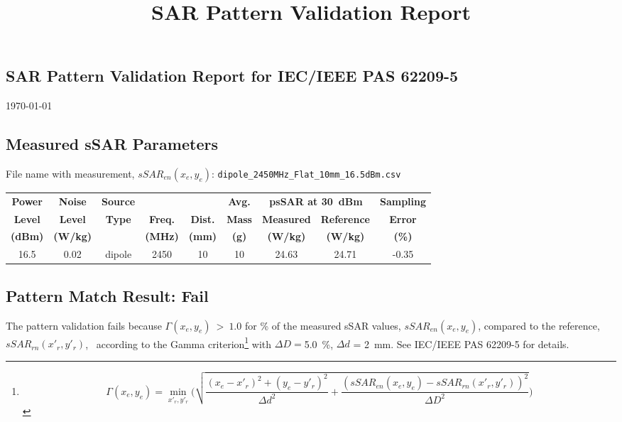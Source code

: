 \documentclass{article}
\title{SAR Pattern Validation Report}
\newcommand{\filemeas}{dipole\_2450MHz\_Flat\_10mm\_16.5dBm.csv}
\newcommand{\powerlevel}{16.5} %
\newcommand{\noiselevel}{0.02} %
\newcommand{\antennatype}{dipole}
\newcommand{\frequency}{2450} %
\newcommand{\distance}{10} %
\newcommand{\mass}{10}  %
\newcommand{\pssarref}{24.71}  %
\newcommand{\pssarmeas}{24.63} %
\newcommand{\errscale}{-0.35} %
\newcommand{\deltadist}{2~mm\xspace}
\newcommand{\deltadose}{5.0~\%\xspace}
\newcommand{\passfail}{\textbf{Fail}}
\newcommand{\statement}{The pattern validation fails because $\Gamma (x_e,y_e)~>~1.0$ for \failrate \% of the measured sSAR values, $sSAR_{en}(x_e,y_e)$, compared to the reference, $sSAR_{rn}(x'_r,y'_r)$, }
\newcommand{\passfail}{\textbf{Pass}}
\newcommand{\statement}{The pattern validation passes because $\Gamma (x_e,y_e)~>~1.0$ for all of the measured sSAR values, $sSAR_{en}(x_e,y_e)$, compared to the reference, $sSAR_{rn}(x'_r,y'_r)$, }
\begin{document}
\thispagestyle{empty}
\begin{center}
    \section*{SAR Pattern Validation Report for IEC/IEEE PAS 62209-5}
    \today
\end{center}

\subsection*{Measured sSAR Parameters}

File name with measurement, $sSAR_{en}(x_e,y_e)$: \texttt{\filemeas}

\begin{table}[htpb] \centering
\begin{tabular}{cccccc|ccc}
\textbf{Power} & \textbf{Noise} & \textbf{Source} &&& \textbf{Avg.}&\multicolumn{2}{c}{\textbf{psSAR at 30~dBm}}& \textbf{Sampling} \\
\textbf{Level} & \textbf{Level} &\textbf{Type} & \textbf{Freq.} & \textbf{Dist.} & \textbf{Mass} & \textbf{Measured} & \textbf{Reference} & \textbf{Error} \\
\textbf{(dBm)} & \textbf{(W/kg)} & & \textbf{(MHz)} & \textbf{(mm)} & \textbf{(g)} & \textbf{(W/kg)} & \textbf{(W/kg)} & \textbf{(\%)} \\\hline
\powerlevel & \noiselevel & \antennatype & \frequency & \distance & \mass & \pssarmeas & \pssarref & \errscale \\
\end{tabular}
\label{tab:meas-params}
\end{table}

\FloatBarrier
\subsection*{Pattern Match Result: \passfail}

\statement ~according to the Gamma criterion\footnote{
\[
\Gamma (x_e, y_e) = \min_{x'_r,y'_r}\Bigg(\sqrt{\frac{(x_e-x'_r)^2+(y_e-y'_r)^2}{\Delta d^2}+\frac{(sSAR_{en}(x_e,y_e)-sSAR_{rn}(x'_r,y'_r))^2}{\Delta D^2}}\Bigg)
\]
} with $\Delta D = $\deltadose, $\Delta d$ = \deltadist. See IEC/IEEE PAS 62209-5 for details.
\end{document}
